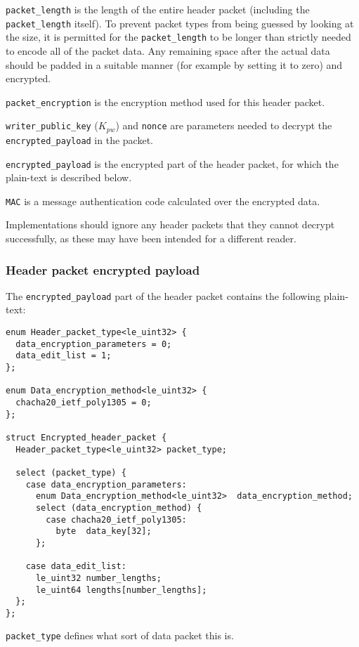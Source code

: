 \documentclass[10pt]{article}
\newcommand{\kw}[1]{\texttt{#1}}
\begin{document}
\kw{packet\_length} is the length of the entire header packet (including the \kw{packet\_length} itself).
To prevent packet types from being guessed by looking at the size, it is permitted for the \kw{packet\_length} to be
longer than strictly needed to encode all of the packet data.
Any remaining space after the actual data should be padded in a suitable manner (for example by setting it to zero)
and encrypted.

\kw{packet\_encryption} is the encryption method used for this header packet.

\kw{writer\_public\_key} ($K_{pw}$) and \kw{nonce} are parameters needed to decrypt the \kw{encrypted\_payload} in the
packet.

\kw{encrypted\_payload} is the encrypted part of the header packet, for which the plain-text is described below.

\kw{MAC} is a message authentication code calculated over the encrypted data.

Implementations should ignore any header packets that they cannot decrypt successfully, as these may have
been intended for a different reader.

\subsubsection{Header packet encrypted payload}

The \kw{encrypted\_payload} part of the header packet contains the following plain-text:

\begin{verbatim}
enum Header_packet_type<le_uint32> {
  data_encryption_parameters = 0;
  data_edit_list = 1;
};

enum Data_encryption_method<le_uint32> {
  chacha20_ietf_poly1305 = 0;
};

struct Encrypted_header_packet {
  Header_packet_type<le_uint32> packet_type;

  select (packet_type) {
    case data_encryption_parameters:
      enum Data_encryption_method<le_uint32>  data_encryption_method;
      select (data_encryption_method) {
        case chacha20_ietf_poly1305:
          byte  data_key[32];
      };

    case data_edit_list:
      le_uint32 number_lengths;
      le_uint64 lengths[number_lengths];
  };
};
\end{verbatim}

\kw{packet\_type} defines what sort of data packet this is.
\end{document}
